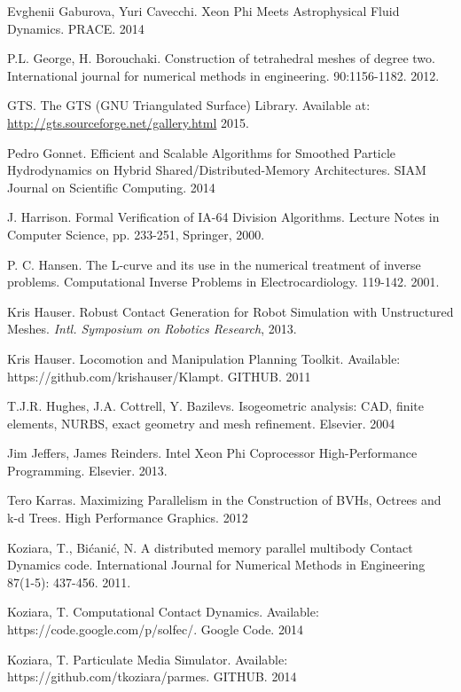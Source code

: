 \documentclass[times,12pt]{ACME2015article}
\begin{document}
\begin{thebibliography}{99}
Evghenii Gaburova, Yuri Cavecchi. Xeon Phi Meets Astrophysical Fluid Dynamics. PRACE. 2014

P.L. George, H. Borouchaki. Construction of tetrahedral meshes of degree two. International journal for numerical methods in engineering. 90:1156-1182. 2012.

GTS. The GTS (GNU Triangulated Surface) Library. Available at: \url{http://gts.sourceforge.net/gallery.html} 2015.

Pedro Gonnet. Efficient and Scalable Algorithms for Smoothed Particle Hydrodynamics on Hybrid Shared/Distributed-Memory Architectures. SIAM Journal on Scientific Computing. 2014

J. Harrison. Formal Verification of IA-64 Division Algorithms. Lecture Notes in Computer Science, pp. 233-251, Springer, 2000.

P. C. Hansen. The L-curve and its use in the numerical treatment of inverse problems. Computational Inverse Problems in Electrocardiology. 119-142. 2001.

Kris Hauser. Robust Contact Generation for Robot
Simulation with Unstructured Meshes. {\em Intl. Symposium on Robotics Research}, 2013.

Kris Hauser. Locomotion and Manipulation Planning Toolkit. Available: https://github.com/krishauser/Klampt. GITHUB. 2011


T.J.R. Hughes, J.A. Cottrell, Y. Bazilevs. Isogeometric analysis: CAD, finite elements, NURBS, exact geometry and mesh refinement. Elsevier. 2004

Jim Jeffers, James Reinders. Intel Xeon Phi Coprocessor High-Performance Programming. Elsevier. 2013.

Tero Karras. Maximizing Parallelism in the Construction of BVHs, Octrees and k-d Trees. High Performance Graphics. 2012

Koziara, T., Bićanić, N. A distributed memory parallel multibody Contact Dynamics code. International Journal for Numerical Methods in Engineering 87(1-5): 437-456. 2011.

Koziara, T. Computational Contact Dynamics. Available: https://code.google.com/p/solfec/. Google Code. 2014

Koziara, T. Particulate Media Simulator. Available: https://github.com/tkoziara/parmes. GITHUB. 2014


\end{thebibliography}
\end{document}
